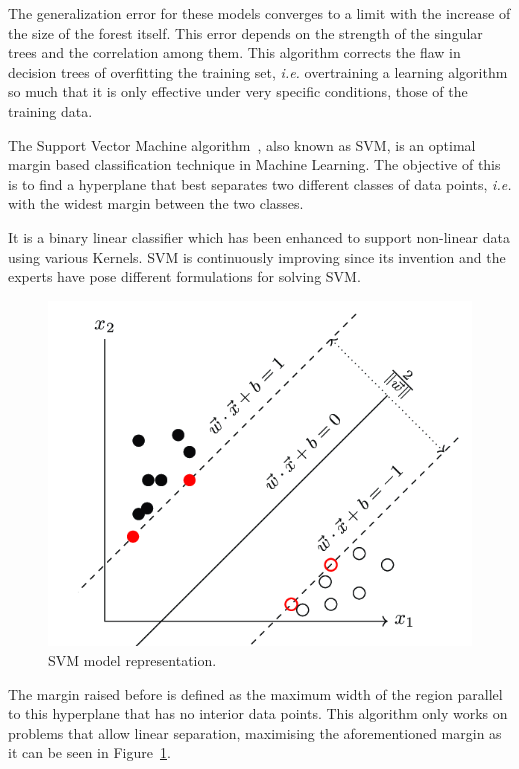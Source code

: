 The generalization error for these models converges to a limit with the increase of the size of the forest itself. This error depends on the strength of the singular trees and the correlation among them. This algorithm corrects the flaw in decision trees of overfitting the training set, \textit{i.e.} overtraining a learning algorithm so much that it is only effective under very specific conditions, those of the training data.

The Support Vector Machine algorithm~\cite{chauhan2019problem}, also known as SVM, is an optimal margin based classification technique in Machine Learning. The objective of this is to find a hyperplane that best separates two different classes of data points,\textit{ i.e.} with the widest margin between the two classes. 

It is a binary linear classifier which has been enhanced to support non-linear data using various Kernels. SVM is continuously improving since its invention and the experts have pose different formulations for solving SVM. 

\begin{figure}[!htp]
    \centering
    \includegraphics[scale=0.37]{img/detection/SVM.png}
    \caption{SVM model representation.}
    \label{fig:SVM}
\end{figure}

The margin raised before is defined as the maximum width of the region parallel to this hyperplane that has no interior data points. This algorithm only works on problems that allow linear separation, maximising the aforementioned margin as it can be seen in Figure~\ref{fig:SVM}.

